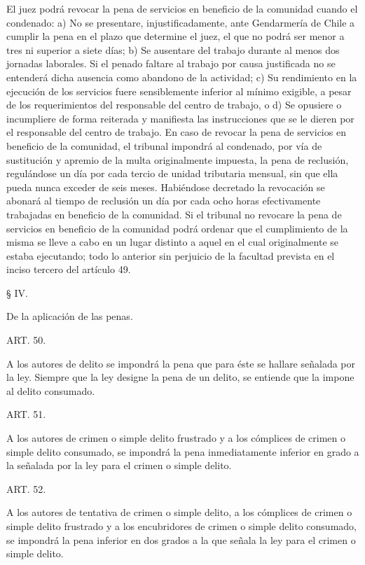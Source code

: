     El juez podrá revocar la pena de servicios en beneficio de la comunidad cuando el condenado:
    a) No se presentare, injustificadamente, ante Gendarmería de Chile a cumplir la pena en el plazo que determine el juez, el que no podrá ser menor a tres ni superior a siete días;
    b) Se ausentare del trabajo durante al menos dos jornadas laborales. Si el penado faltare al trabajo por causa justificada no se entenderá dicha ausencia como abandono de la actividad;
    c) Su rendimiento en la ejecución de los servicios fuere sensiblemente inferior al mínimo exigible, a pesar de los requerimientos del responsable del centro de trabajo, o
    d) Se opusiere o incumpliere de forma reiterada y manifiesta las instrucciones que se le dieren por el responsable del centro de trabajo.
    En caso de revocar la pena de servicios en beneficio de la comunidad, el tribunal impondrá al condenado, por vía de sustitución y apremio de la multa originalmente impuesta, la pena de reclusión, regulándose un día por cada tercio de unidad tributaria mensual, sin que ella pueda nunca exceder de seis meses.
    Habiéndose decretado la revocación se abonará al tiempo de reclusión un día por cada ocho horas efectivamente trabajadas en beneficio de la comunidad.
    Si el tribunal no revocare la pena de servicios en beneficio de la comunidad podrá ordenar que el cumplimiento de la misma se lleve a cabo en un lugar distinto a aquel en el cual originalmente se estaba ejecutando; todo lo anterior sin perjuicio de la facultad prevista en el inciso tercero del artículo 49.



    § IV.

    De la aplicación de las penas.


    ART. 50.

    A los autores de delito se impondrá la pena que para éste se hallare señalada por la ley.
    Siempre que la ley designe la pena de un delito, se entiende que la impone al delito consumado.


    ART. 51.

    A los autores de crimen o simple delito frustrado y a los cómplices de crimen o simple delito consumado, se impondrá la pena inmediatamente inferior en grado a la señalada por la ley para el crimen o simple delito.


    ART. 52.

    A los autores de tentativa de crimen o simple delito, a los cómplices de crimen o simple delito frustrado y a los encubridores de crimen o simple delito consumado, se impondrá la pena inferior en dos grados a la que señala la ley para el crimen o simple delito.


